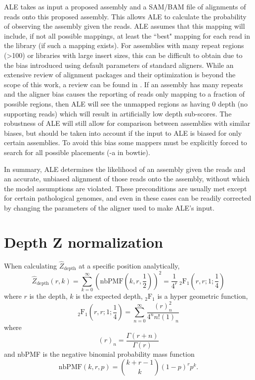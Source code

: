 \documentclass[phd,tocprelim]{cornell}
\begin{document}
ALE takes as input a proposed assembly and a SAM/BAM \cite{Li2009} file of alignments of reads onto this proposed assembly. This allows ALE to calculate the probability of observing the assembly given the reads. ALE assumes that this mapping will include, if not all possible mappings, at least the ``best" mapping for each read in the library (if such a mapping exists). For assemblies with many repeat regions (>100) or libraries with large insert sizes, this can be difficult to obtain due to the bias introduced using default parameters of standard aligners. While an extensive review of alignment packages and their optimization is beyond the scope of this work, a review can be found in \cite{Li2010}. If an assembly has many repeats and the aligner bias causes the reporting of reads only mapping to a fraction of possible regions, then ALE will see the unmapped regions as having 0 depth (no supporting reads) which will result in artificially low depth sub-scores. The robustness of ALE will still allow for comparison between assemblies with similar biases, but should be taken into account if the input to ALE is biased for only certain assemblies. To avoid this bias some mappers must be explicitly forced to search for all possible placements (-a in bowtie).

In summary, ALE determines the likelihood of an assembly given the reads and an accurate, unbiased alignment of those reads onto the assembly, without which the model assumptions are violated. These preconditions are usually met except for certain pathological genomes, and even in these cases can be readily corrected by changing the parameters of the aligner used to make ALE's input.


\section{Depth Z normalization} %
\label{sec:DepthZnormalization}

When calculating $\hat{Z}_{\text{depth}}$ at a specific position analytically,
\begin{equation}
    \hat{Z}_{\text{depth}}(r,k) = \sum_{k=0}^{\infty} \left(\mbox{nbPMF}\left(k,r,\frac{1}{2}\right)\right)^{2} = \frac{1}{4^{r}} \ _{2}\mbox{F}_{1}\left(r,r;1;\frac{1}{4}\right)
\end{equation}
where $r$ is the depth, $k$ is the expected depth, $_{2}\mbox{F}_{1}$ is a hyper geometric function,
\begin{equation}
    _{2}\mbox{F}_{1}\left(r,r;1;\frac{1}{4}\right) = \sum_{n=0}^{\infty} \frac{(r)^{2}_{n}}{4^{n}n!(1)_{n}}
\end{equation}
where
\begin{equation}
    (r)_{n} = \frac{\Gamma(r+n)}{\Gamma(r)}    
\end{equation}
and nbPMF is the negative binomial probability mass function
\begin{equation}
    \mbox{nbPMF}\left(k,r,p\right) = {k+r-1 \choose k} (1-p)^{r}p^{k}.
\end{equation}
\end{document}
